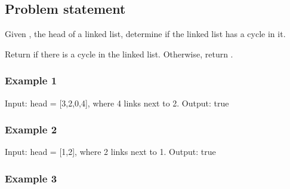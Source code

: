 \documentclass[letterpaper,12pt,english]{book}
\begin{document}
\subsection{Problem statement\sphinxfootnotemark[107]}
\label{\detokenize{Two_Pointers/08_TP_141_Linked_List_Cycle:problem-statement}}%
\begin{footnotetext}[107]\sphinxAtStartFootnote
{}
%
\end{footnotetext}\ignorespaces 
\sphinxAtStartPar
Given , the head of a linked list, determine if the linked list has a cycle in it.

\sphinxAtStartPar
Return  if there is a cycle in the linked list. Otherwise, return .


\subsubsection{Example 1}
\label{\detokenize{Two_Pointers/08_TP_141_Linked_List_Cycle:example-1}}
\sphinxAtStartPar
{}

\begin{sphinxVerbatim}[commandchars=\\\{\}]
Input: head = [3,2,0,\PYGZhy{}4], where \PYGZhy{}4 links next to 2.
Output: true
\end{sphinxVerbatim}


\subsubsection{Example 2}
\label{\detokenize{Two_Pointers/08_TP_141_Linked_List_Cycle:example-2}}
\sphinxAtStartPar
{}

\begin{sphinxVerbatim}[commandchars=\\\{\}]
Input: head = [1,2], where 2 links next to 1.
Output: true
\end{sphinxVerbatim}


\subsubsection{Example 3}
\label{\detokenize{Two_Pointers/08_TP_141_Linked_List_Cycle:example-3}}
\sphinxAtStartPar
{}
\end{document}
